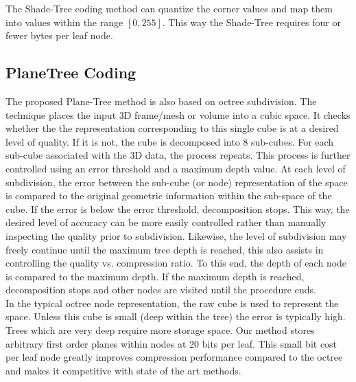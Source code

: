 The Shade-Tree coding method can quantize the corner values and map them into values within the range $[0,255]$. This way the Shade-Tree requires four or fewer bytes per leaf node. \\


\subsection{PlaneTree Coding}

The proposed Plane-Tree method is also based on octree subdivision. The technique places the input 3D frame/mesh or volume into a cubic space. It checks whether the the representation corresponding to this single cube is at a desired level of quality. If it is not, the cube is decomposed into 8 sub-cubes. For each sub-cube associated with the 3D data, the process repeats. This process is further controlled using an error threshold and a maximum depth value. At each level of subdivision, the error between the sub-cube (or node) representation of the space is compared to the original geometric information within the sub-space of the cube. If the error is below the error threshold, decomposition stops. This way, the desired level of accuracy can be more easily controlled rather than manually inspecting the quality prior to subdivision. Likewise, the level of subdivision may freely continue until the maximum tree depth is reached, this also assists in controlling the quality vs. compression ratio. To this end, the depth of each node is compared to the maximum depth. If the maximum depth is reached, decomposition stops and other nodes are visited until the procedure ends. \\

In the typical octree node representation, the raw cube is used to represent the space. Unless this cube is small (deep within the tree) the error is typically high. Trees which are very deep require more storage space. Our method stores arbitrary first order planes within nodes at 20 bits per leaf. This small bit cost per leaf node greatly improves compression performance compared to the octree and makes it competitive with state of the art methods. \\

